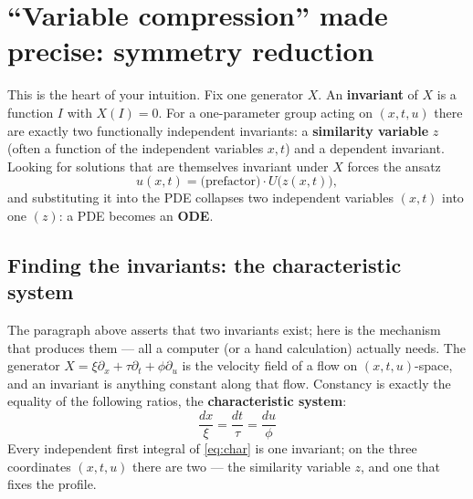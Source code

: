 \documentclass[11pt]{article}
\theoremstyle{definition}
\theoremstyle{remark}
\begin{document}
\section{``Variable compression'' made precise: symmetry reduction}

This is the heart of your intuition. Fix one generator $X$. An \textbf{invariant} of $X$ is a function
$I$ with $X(I)=0$. For a one-parameter group acting on $(x,t,u)$ there are exactly two functionally
independent invariants: a \textbf{similarity variable} $z$ (often a function of the independent variables $x,t$) and a dependent invariant. Looking for
solutions that are themselves invariant under $X$ forces the ansatz
\[
u(x,t)=\big(\text{prefactor}\big)\cdot U\!\big(z(x,t)\big),
\]
and substituting it into the PDE collapses two independent variables $(x,t)$ into one $(z)$: a PDE becomes
an \textbf{ODE}.

\subsection{Finding the invariants: the characteristic system}\label{sec:char}

The paragraph above asserts that two invariants exist; here is the mechanism that produces them ---
all a computer (or a hand calculation) actually needs. The generator
$X=\xi\partial_x+\tau\partial_t+\phi\partial_u$ is the velocity field of a flow on $(x,t,u)$-space, and
an invariant is anything constant along that flow. Constancy is exactly the equality of the following
ratios, the \textbf{characteristic system}:
\begin{equation}\label{eq:char}
\boxed{\;\dfrac{dx}{\xi}=\dfrac{dt}{\tau}=\dfrac{du}{\phi}\;}
\end{equation}
Every independent first integral of \eqref{eq:char} is one invariant; on the three coordinates
$(x,t,u)$ there are two --- the similarity variable $z$, and one that fixes the profile.
\end{document}
